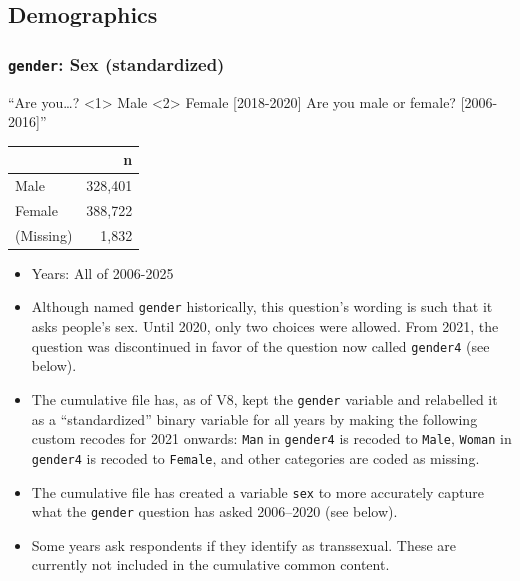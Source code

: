 \documentclass[10pt,article,oneside]{memoir}
\begin{document}
\subsection{Demographics}\label{demographics}

\subsubsection{\texorpdfstring{\texttt{gender}: Sex
(standardized)}{gender: Sex (standardized)}}\label{gender-sex-standardized}

``Are you\ldots? \textless1\textgreater{} Male \textless2\textgreater{}
Female {[}2018-2020{]} Are you male or female? {[}2006-2016{]}''

\begin{table}[H]
\centering
\begin{tabular}[t]{lr}
\toprule
 & n\\
\midrule
Male & 328,401\\
Female & 388,722\\
(Missing) & 1,832\\
\bottomrule
\end{tabular}
\end{table}

\begin{itemize}
\tightlist
\item
  Years: All of 2006-2025
\item
  Although named \texttt{gender} historically, this question's wording
  is such that it asks people's sex. Until 2020, only two choices were
  allowed. From 2021, the question was discontinued in favor of the
  question now called \texttt{gender4} (see below).
\item
  The cumulative file has, as of V8, kept the \texttt{gender} variable
  and relabelled it as a ``standardized'' binary variable for all years
  by making the following custom recodes for 2021 onwards: \texttt{Man}
  in \texttt{gender4} is recoded to \texttt{Male}, \texttt{Woman} in
  \texttt{gender4} is recoded to \texttt{Female}, and other categories
  are coded as missing.
\item
  The cumulative file has created a variable \texttt{sex} to more
  accurately capture what the \texttt{gender} question has asked
  2006--2020 (see below).
\item
  Some years ask respondents if they identify as transsexual. These are
  currently not included in the cumulative common content.
\end{itemize}
\end{document}
